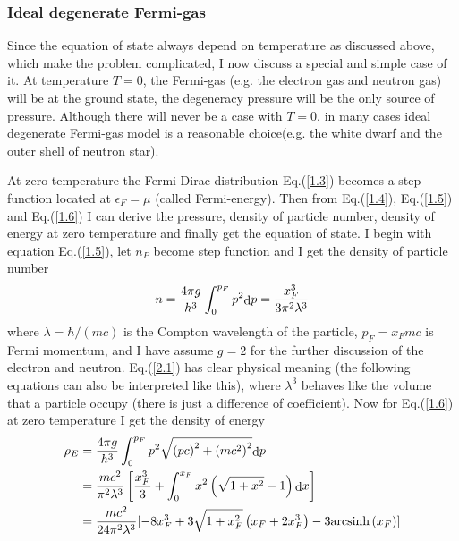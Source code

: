 \documentclass[reprint]{revtex4-1}
\begin{document}
\subsubsection{Ideal degenerate Fermi-gas}
Since the equation of state always depend on temperature as discussed above, which make the problem complicated, I now discuss a special and simple case of it. At temperature $T=0$,  the Fermi-gas (e.g. the electron gas and neutron gas) will be at the ground state, the degeneracy pressure will be the only source of pressure. Although there will never be a case with $T=0$, in many cases ideal degenerate Fermi-gas model is a reasonable choice(e.g. the white dwarf and the outer shell of neutron star). \par
At zero temperature the Fermi-Dirac distribution Eq.(\ref{1.3}) becomes a step function located at $\epsilon_F=\mu$ (called Fermi-energy). Then from Eq.(\ref{1.4}), Eq.(\ref{1.5}) and Eq.(\ref{1.6}) I can derive the pressure, density of particle number, density of energy at zero temperature and finally get the equation of state. I begin with equation Eq.(\ref{1.5}), let $n_P$  become step function and I get the density of particle number 
\begin{equation}
n = \frac{{4\pi g}}{{{h^3}}}\int_0^{{p_F}} {{p^2}{\mathop{\rm d}\nolimits} p}  = \frac{{x_F^3}}{{3{\pi ^2}{\lambda ^3}}} \label{2.1}
\end{equation}
where $\lambda  = \hbar /\left( {mc} \right)$ is the Compton wavelength of the particle, ${p_F} = {x_F}mc$ is Fermi momentum, and I have assume $g=2$ for the further discussion of the electron and neutron. Eq.(\ref{2.1}) has clear physical meaning (the following equations can also be interpreted like this), where $\lambda^3$ behaves like the volume that a particle occupy (there is just a difference of coefficient). Now for Eq.(\ref{1.6}) at zero temperature I get the density of energy
\begin{align}
	 {\rho _E} &= {{4\pi g} \over {{h^3}}}\int_0^{{p_F}} {{p^2}\sqrt {{{\left( {pc} \right)}^2} + {{\left( {m{c^2}} \right)}^2}} {\mathop{\rm d}\nolimits} p}  \nonumber \\
	 &= {{m{c^2}} \over {{\pi ^2}{\lambda ^3}}}\left[ {{{x_F^3} \over 3} + \int_0^{{x_F}} {{x^2}\left( {\sqrt {1 + {x^2}}  - 1} \right){\mathop{\rm d}\nolimits} x} } \right]  \nonumber \\ 
	& {\rm{                                 }} = {{m{c^2}} \over {24{\pi ^2}{\lambda ^3}}}[{ - 8x_F^3 + 3\sqrt {1 + x_F^2} \left( {{x_F} + 2x_F^3} \right) - 3{\mathop{\rm arcsinh}\nolimits} \left( {{x_F}} \right)}] \label{2.2}
\end{align}
\end{document}
